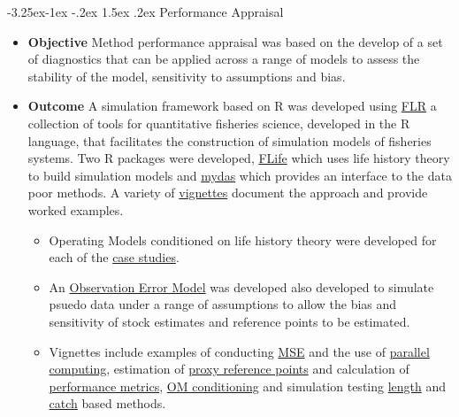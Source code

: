 \documentclass[a4paper, 10pt]{article}
\makeatletter
\renewcommand{\subsection}{\@startsection{subsection}{2}{\z@}%
 {-3.25ex\@plus -1ex \@minus -.2ex}%
 {1.5ex \@plus .2ex}%
 {\normalfont\bfseries\slshape}}
\makeatother
\begin{document}
\subsection{Performance Appraisal}
 
\begin{itemize}[labelindent=\parindent,noitemsep,topsep=0pt,parsep=0pt,partopsep=0pt]
 \item \textbf{Objective} Method performance appraisal was based on the develop of a set of diagnostics that can be applied across a range of models to assess the stability of the model, sensitivity to assumptions and bias.
 
 \item \textbf{Outcome} A simulation framework based on R was developed using \href{http://www.flr-project.org/}{FLR} a collection of tools for quantitative fisheries science, developed in the R language, that facilitates the construction of simulation models of fisheries systems. Two R packages were developed, \href{https://github.com/flr/flife}{FLife} which uses life history theory to build simulation models and 
    \href{https://github.com/flr/mydas/wiki}{mydas} 
    which provides an interface to the data poor methods. A variety of \href{https://3o2y9wugzp1kfxr5hvzgzq-on.drv.tw/MyDas/vignettes.html}{vignettes} document the approach and provide worked examples. 
    \begin{itemize}
   \item Operating Models conditioned on life history theory were developed for each of the 
    \href{https://3o2y9wugzp1kfxr5hvzgzq-on.drv.tw/MyDas/om.html}{case studies}.
    \item An \href{https://3o2y9wugzp1kfxr5hvzgzq-on.drv.tw/MyDas/vignettes/oem.html}{Observation Error Model} was developed also developed to simulate psuedo data under a range of assumptions to allow the bias and sensitivity of stock estimates and reference points to be estimated.    
    \item Vignettes include examples of conducting \href{https://3o2y9wugzp1kfxr5hvzgzq-on.drv.tw/MyDas/vignettes/mse.html}{MSE} and the use of \href{https://3o2y9wugzp1kfxr5hvzgzq-on.drv.tw/MyDas/vignettes/parallel.html}{parallel computing}, estimation of
    \href{https://3o2y9wugzp1kfxr5hvzgzq-on.drv.tw/MyDas/vignettes/proxies.html}{proxy reference points} and calculation of \href{https://3o2y9wugzp1kfxr5hvzgzq-on.drv.tw/MyDas/vignettes/performance.html}{performance metrics},  \href{https://3o2y9wugzp1kfxr5hvzgzq-on.drv.tw/MyDas/vignettes/turbot.html}{OM conditioning} and simulation testing \href{https://3o2y9wugzp1kfxr5hvzgzq-on.drv.tw/MyDas/vignettes/length.html}{length} and 
   \href{https://3o2y9wugzp1kfxr5hvzgzq-on.drv.tw/MyDas/vignettes/sra.html}{catch} based methods.
    \end{itemize}
\end{itemize}
\end{document}

